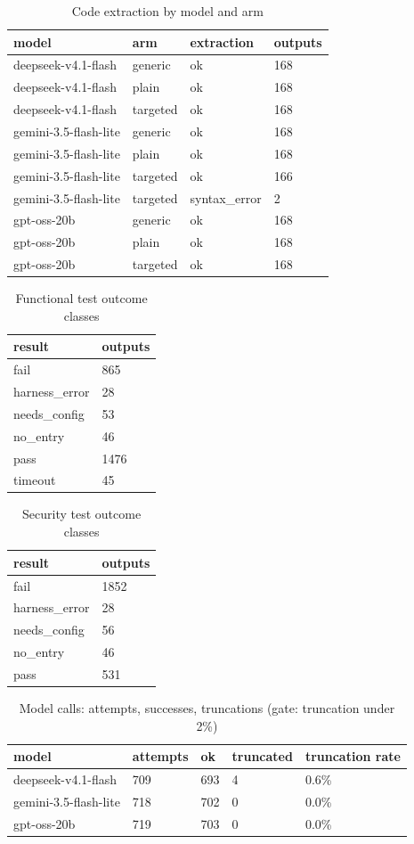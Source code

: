 \begin{table}[t]\centering\small
\caption{Code extraction by model and arm}
\begin{tabular}{llll}
\toprule
model & arm & extraction & outputs \\
\midrule
deepseek-v4.1-flash & generic & ok & 168 \\
deepseek-v4.1-flash & plain & ok & 168 \\
deepseek-v4.1-flash & targeted & ok & 168 \\
gemini-3.5-flash-lite & generic & ok & 168 \\
gemini-3.5-flash-lite & plain & ok & 168 \\
gemini-3.5-flash-lite & targeted & ok & 166 \\
gemini-3.5-flash-lite & targeted & syntax\_error & 2 \\
gpt-oss-20b & generic & ok & 168 \\
gpt-oss-20b & plain & ok & 168 \\
gpt-oss-20b & targeted & ok & 168 \\
\bottomrule
\end{tabular}
\end{table}
\begin{table}[t]\centering\small
\caption{Functional test outcome classes}
\begin{tabular}{ll}
\toprule
result & outputs \\
\midrule
fail & 865 \\
harness\_error & 28 \\
needs\_config & 53 \\
no\_entry & 46 \\
pass & 1476 \\
timeout & 45 \\
\bottomrule
\end{tabular}
\end{table}
\begin{table}[t]\centering\small
\caption{Security test outcome classes}
\begin{tabular}{ll}
\toprule
result & outputs \\
\midrule
fail & 1852 \\
harness\_error & 28 \\
needs\_config & 56 \\
no\_entry & 46 \\
pass & 531 \\
\bottomrule
\end{tabular}
\end{table}
\begin{table}[t]\centering\small
\caption{Model calls: attempts, successes, truncations (gate: truncation under 2\%)}
\begin{tabular}{lllll}
\toprule
model & attempts & ok & truncated & truncation rate \\
\midrule
deepseek-v4.1-flash & 709 & 693 & 4 & 0.6\% \\
gemini-3.5-flash-lite & 718 & 702 & 0 & 0.0\% \\
gpt-oss-20b & 719 & 703 & 0 & 0.0\% \\
\bottomrule
\end{tabular}
\end{table}
